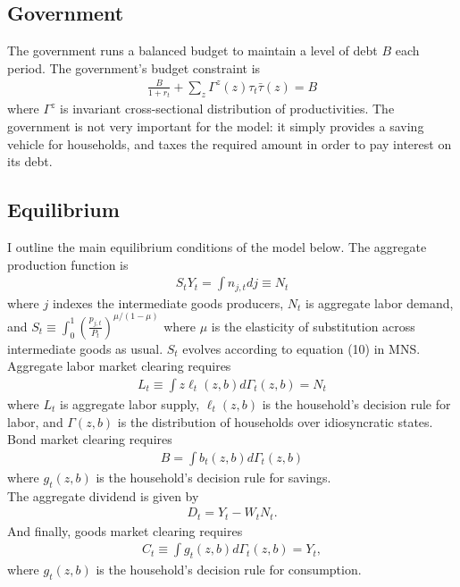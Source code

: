 \documentclass[12pt]{article}
\begin{document}
\subsection{Government}
The government runs a balanced budget to maintain a level of debt $B$ each period. The government's budget constraint is
\begin{align*}
\frac{B}{1+r_t} + \sum_z \Gamma^z(z)\tau_t\bar\tau(z) = B
\end{align*}
where $\Gamma^z$ is invariant cross-sectional distribution of productivities. The government is not very important for the model: it simply provides a saving vehicle for households, and taxes the required amount in order to pay interest on its debt.

\subsection{Equilibrium}
I outline the main equilibrium conditions of the model below. The aggregate production function is 
\begin{align*}
S_tY_t = \int n_{j,t}dj \equiv N_t
\end{align*} 
where $j$ indexes the intermediate goods producers, $N_t$ is aggregate labor demand, and $S_t \equiv \int_0^1 \left(\frac{p_{j,t}}{P_t}\right)^{\mu/(1-\mu)}$ where $\mu$ is the elasticity of substitution across intermediate goods as usual. $S_t$ evolves according to equation (10) in MNS.\\

Aggregate labor market clearing requires
\begin{align*}
L_t \equiv \int z\ell_t(z,b) d\Gamma_t(z,b) = N_t
\end{align*}
where $L_t$ is aggregate labor supply, $\ell_t(z,b)$ is the household's decision rule for labor, and $\Gamma(z,b)$ is the distribution of households over idiosyncratic states. \\

Bond market clearing requires
\begin{align*}
B = \int b_t(z,b)d\Gamma_t(z,b)
\end{align*}
where $g_t(z,b)$ is the household's decision rule for savings. \\

The aggregate dividend is given by
\begin{align*}
D_t = Y_t - W_tN_t.
\end{align*}
And finally, goods market clearing requires
\begin{align*}
C_t \equiv \int g_t(z,b)d\Gamma_t(z,b) = Y_t,
\end{align*}
where $g_t(z,b)$ is the household's decision rule for consumption.\\
\end{document}
